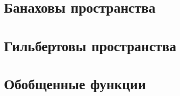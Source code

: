 
\section{Банаховы пространства}





% 






\section{Гильбертовы пространства}






\section{Обобщенные функции}







% 

%  
%  
% 
% 
% 



% 



